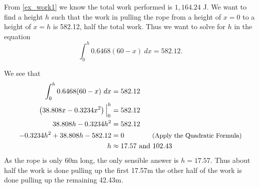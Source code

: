 {From \autoref{ex_work1} we know the total work performed is $1,164.24$ J. We want to find a height $h$ such that the work in pulling the rope from a height of $x=0$ to a height of $x=h$ is 582.12, half the total work. Thus we want to solve for $h$ in the equation
\[\int_0^h 0.6468(60-x)\ dx = 582.12.\]

We see that
\begin{align*}
	\int_0^h 0.6468(60-x)\ dx &= 582.12 \\
	\left(38.808x-0.3234x^2\right)\Big|_0^h &=582.12 \\
	38.808h-0.3234h^2 &=582.12 \\
	-0.3234h^2+38.808h-582.12 &=0 \qquad\qquad\text{\small(Apply the Quadratic Formula)} \\
	h&\approx17.57 \ \text{and}\ 102.43
\end{align*}
As the rope is only 60m long, the only sensible answer is $h=17.57$. Thus about half the work is done pulling up the first 17.57m the other half of the work is done pulling up the remaining 42.43m.}

